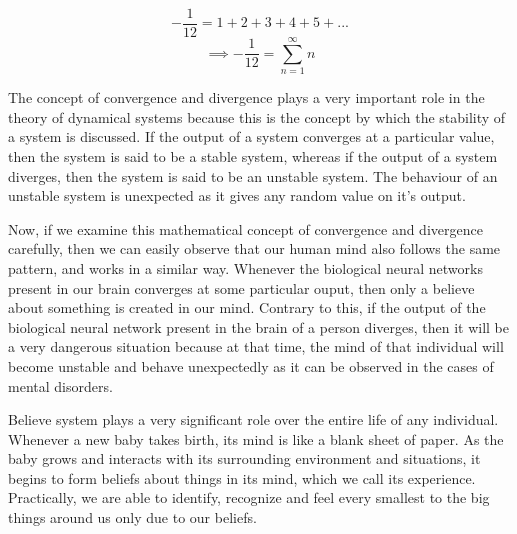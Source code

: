 \[-\dfrac{1}{12} = 1 + 2 + 3 + 4 + 5 + ...\]
\begin{equation}\label{eq:2}
	\implies\boxed{-\dfrac{1}{12} = \sum\limits_{n = 1}^\infty n}
\end{equation}
\vspace{1\baselineskip}

The concept of convergence and divergence plays a very important role in the theory of dynamical systems because this is the concept by which the stability of a system is discussed. If the output of a system converges at a particular value, then the system is said to be a stable system, whereas if the output of a system diverges, then the system is said to be an unstable system. The behaviour of an unstable system is unexpected as it gives any random value on it's output.

Now, if we examine this mathematical concept of convergence and divergence carefully, then we can easily observe that our human mind also follows the same pattern, and works in a similar way. Whenever the biological neural networks present in our brain converges at some particular ouput, then only a believe about something is created in our mind. Contrary to this, if the output of the biological neural network present in the brain of a person diverges, then it will be a very dangerous situation because at that time, the mind of that individual will become unstable and behave unexpectedly as it can be observed in the cases of mental disorders.

Believe system plays a very significant role over the entire life of any individual. Whenever a new baby takes birth, its mind is like a blank sheet of paper. As the baby grows and interacts with its surrounding environment and situations, it begins to form beliefs about things in its mind, which we call its experience. Practically, we are able to identify, recognize and feel every smallest to the big things around us only due to our beliefs.
